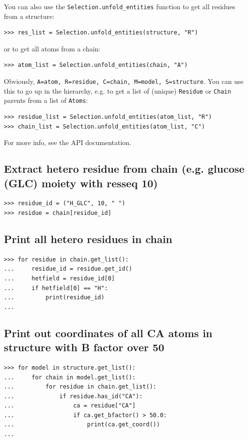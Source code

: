 You can also use the \verb+Selection.unfold_entities+ function to get all residues from a structure:
\begin{verbatim}
>>> res_list = Selection.unfold_entities(structure, "R")
\end{verbatim}
or to get all atoms from a chain:
\begin{verbatim}
>>> atom_list = Selection.unfold_entities(chain, "A")
\end{verbatim}
Obviously, \verb+A=atom, R=residue, C=chain, M=model, S=structure+.
You can use this to go up in the hierarchy, e.g. to get a list of
(unique) \verb+Residue+ or \verb+Chain+ parents from a list of
\verb+Atoms+:

\begin{verbatim}
>>> residue_list = Selection.unfold_entities(atom_list, "R")
>>> chain_list = Selection.unfold_entities(atom_list, "C")
\end{verbatim}
For more info, see the API documentation.

\subsection*{Extract hetero residue from chain (e.g. glucose (GLC) moiety with resseq 10)}

\begin{verbatim}
>>> residue_id = ("H_GLC", 10, " ")
>>> residue = chain[residue_id]
\end{verbatim}

\subsection*{Print all hetero residues in chain}

\begin{verbatim}
>>> for residue in chain.get_list():
...     residue_id = residue.get_id()
...     hetfield = residue_id[0]
...     if hetfield[0] == "H":
...         print(residue_id)
...
\end{verbatim}

\subsection*{Print out coordinates of all CA atoms in structure with B factor over 50}

\begin{verbatim}
>>> for model in structure.get_list():
...     for chain in model.get_list():
...         for residue in chain.get_list():
...             if residue.has_id("CA"):
...                 ca = residue["CA"]
...                 if ca.get_bfactor() > 50.0:
...                     print(ca.get_coord())
...
\end{verbatim}

